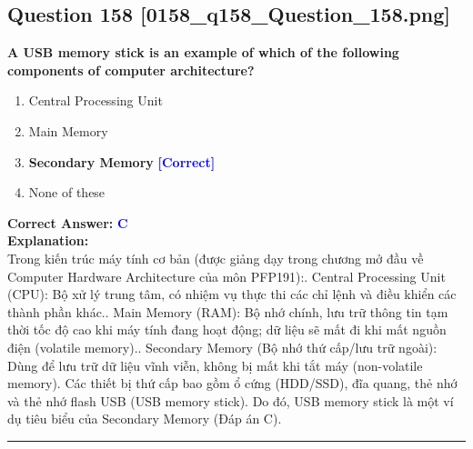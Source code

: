 \documentclass[11pt,a4paper]{article}
\begin{document}
\begin{minipage}{\textwidth}
\subsection*{Question 158 \quad \footnotesize{[0158_q158_Question_158.png]}}
\noindent \textbf{A USB memory stick is an example of which of the following components of computer architecture?}

\begin{enumerate}[label=\Alph*.]
    \item Central Processing Unit
    \item Main Memory
    \item \textbf{Secondary Memory} \hfill \textcolor{blue}{\textbf{[Correct]}}
    \item None of these
\end{enumerate}

\noindent \textbf{Correct Answer:} \textcolor{blue}{\textbf{C}} \\[4pt]
\noindent \textbf{Explanation:}\\
Trong kiến trúc máy tính cơ bản (được giảng dạy trong chương mở đầu về Computer Hardware Architecture của môn PFP191):. Central Processing Unit (CPU): Bộ xử lý trung tâm, có nhiệm vụ thực thi các chỉ lệnh và điều khiển các thành phần khác.. Main Memory (RAM): Bộ nhớ chính, lưu trữ thông tin tạm thời tốc độ cao khi máy tính đang hoạt động; dữ liệu sẽ mất đi khi mất nguồn điện (volatile memory).. Secondary Memory (Bộ nhớ thứ cấp/lưu trữ ngoài): Dùng để lưu trữ dữ liệu vĩnh viễn, không bị mất khi tắt máy (non-volatile memory). Các thiết bị thứ cấp bao gồm ổ cứng (HDD/SSD), đĩa quang, thẻ nhớ và thẻ nhớ flash USB (USB memory stick).\newline
Do đó, USB memory stick là một ví dụ tiêu biểu của Secondary Memory (Đáp án C).
\end{minipage}
\vspace{0.8cm}
\hrule
\vspace{0.5cm}
\end{document}

